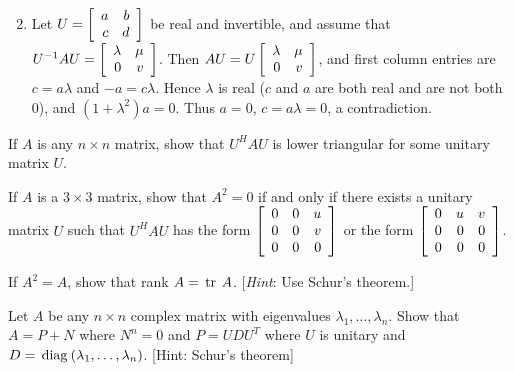 \begin{multicols}{2}
\begin{ex}
\begin{enumerate}[label={\alph*.}]
\end{enumerate}
\begin{sol}
\begin{enumerate}[label={\alph*.}]
\setcounter{enumi}{1}
\item  Let $U = \left[ \begin{array}{rr}
a & b \\
c & d
\end{array}\right]$ be real and invertible, and assume that $U^{-1}AU = \left[ \begin{array}{rr}
\lambda & \mu \\
0 & v
\end{array}\right]$.
 Then $AU = U\left[ \begin{array}{rr}
 \lambda & \mu \\
 0 & v
 \end{array}\right]$, and first column entries are $c = a\lambda$ and $-a = c\lambda$. Hence $\lambda$ is real ($c$ and $a$ are both real and are not both $0$), and $(1 + \lambda^{2})a = 0$. Thus $a = 0$, $c = a\lambda = 0$, a contradiction.

\end{enumerate}
\end{sol}
\end{ex}

\begin{ex}
If $A$ is any $n \times n$ matrix, show that $U^{H}AU$ is lower triangular for some unitary matrix $U$.
\end{ex}

\begin{ex}
If $A$ is a $3 \times 3$ matrix, show that $A^{2} = 0$ if and only if there exists a unitary matrix $U$ such that $U^{H}AU$ has the form $\left[ \begin{array}{rrr}
0 & 0 & u \\
0 & 0 & v \\
0 & 0 & 0
\end{array}\right]$
or the form $\left[ \begin{array}{rrr}
0 & u & v \\
0 & 0 & 0 \\
0 & 0 & 0
\end{array}\right]$.
\end{ex}

\begin{ex}
If $A^{2} = A$, show that rank $A = \thinspace\operatorname{tr\medspace}A$. [\textit{Hint}: Use Schur's theorem.]
\end{ex}

\begin{ex}
Let $A$ be any $n \times n$ complex matrix with eigenvalues $\lambda_1, \dots, \lambda_n$. Show that $A = P+N$ where $N^{n}=0$ and $P=UDU^{T}$ where $U$ is unitary and $D=\thinspace\operatorname{diag\medspace}(\lambda_1,\dots,\lambda_{n})$. [Hint: Schur's theorem]
\end{ex}
\end{multicols}
